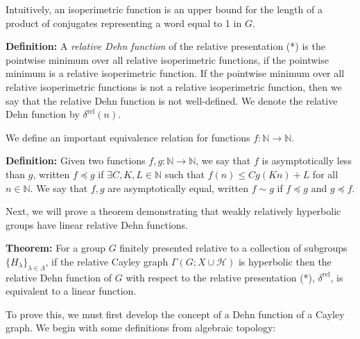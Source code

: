 \documentclass[12pt]{article}
\newcommand{\vs}{\vskip10pt}
\begin{document}
	Intuitively, an isoperimetric function is an upper bound for the length of a product of conjugates representing a word equal to 1 in $G$. 
	
	\vs 
	
	\textbf{Definition: } A \textit{relative Dehn function} of the relative presentation (*) is the pointwise minimum over all relative isoperimetric functions, if the pointwise minimum is a relative isoperimetric function. If the pointwise minimum over all relative isoperimetric functions is not a relative isoperimetric function, then we say that the relative Dehn function is not well-defined. We denote the relative Dehn function by $\delta^{\text{rel}}(n)$.
	
	\vs 
	
	We define an important equivalence relation for functions $f: \mathbb{N} \rightarrow \mathbb{N}$. 
	
	\vs 
	
	\textbf{Definition: } Given two functions $f,g: \mathbb{N} \rightarrow \mathbb{N}$, we say that $f$ is asymptotically less than $g$, written $f \preccurlyeq g$ if $\exists C,K,L \in \mathbb{N}$ such that $f(n) \leq Cg(Kn) + L$ for all $n \in \mathbb{N}$. We say that $f,g$ are asymptotically equal, written $f \sim g$ if $f \preccurlyeq g$ and $g \preccurlyeq f$.
	
	\vs 
	
	Next, we will prove a theorem demonstrating that weakly relatively hyperbolic groups have linear relative Dehn functions. 
	
	\vs 
	
	\textbf{Theorem: } For a group $G$ finitely presented relative to a collection of subgroups $\{H_{\lambda}\}_{\lambda \in \Lambda}$, if the relative Cayley graph $\Gamma(G; X \cup \mathcal{H})$ is hyperbolic then the relative Dehn function of $G$ with respect to the relative presentation (*), $\delta^{\text{rel}}$, is equivalent to a linear function. 
	
	\vs 
	
	To prove this, we must first develop the concept of a Dehn function of a Cayley graph. We begin with some definitions from algebraic topology: 
	
	\vs
	
\end{document}
